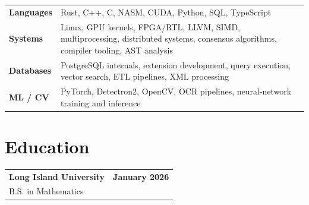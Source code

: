 \documentclass[10pt,letterpaper]{article}
\begin{document}
\begin{tabularx}{\linewidth}{@{}>{\bfseries}l @{\hspace{0.55em}} X@{}}

Languages &
Rust, C++, C, NASM, CUDA, Python, SQL, TypeScript \\

Systems &
Linux, GPU kernels, FPGA/RTL, LLVM, SIMD, multiprocessing,
distributed systems, consensus algorithms, compiler tooling, AST analysis \\

Databases &
PostgreSQL internals, extension development, query execution,
vector search, ETL pipelines, XML processing \\

ML / CV &
PyTorch, Detectron2, OpenCV, OCR pipelines, neural-network training
and inference \\

\end{tabularx}

\section*{Education}

\begin{tabularx}{\linewidth}{@{}X r@{}}
    \textbf{Long Island University} & \textbf{January 2026} \\
    B.S. in Mathematics &
\end{tabularx}
\end{document}
